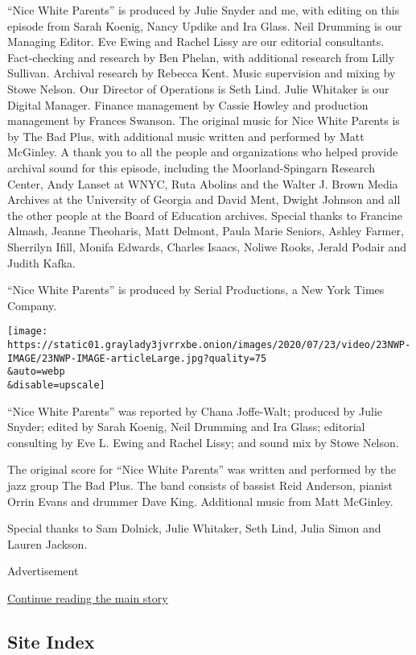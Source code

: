 ``Nice White Parents'' is produced by Julie Snyder and me, with editing
on this episode from Sarah Koenig, Nancy Updike and Ira Glass. Neil
Drumming is our Managing Editor. Eve Ewing and Rachel Lissy are our
editorial consultants. Fact-checking and research by Ben Phelan, with
additional research from Lilly Sullivan. Archival research by Rebecca
Kent. Music supervision and mixing by Stowe Nelson. Our Director of
Operations is Seth Lind. Julie Whitaker is our Digital Manager. Finance
management by Cassie Howley and production management by Frances
Swanson. The original music for Nice White Parents is by The Bad Plus,
with additional music written and performed by Matt McGinley. A thank
you to all the people and organizations who helped provide archival
sound for this episode, including the Moorland-Spingarn Research Center,
Andy Lanset at WNYC, Ruta Abolins and the Walter J. Brown Media Archives
at the University of Georgia and David Ment, Dwight Johnson and all the
other people at the Board of Education archives. Special thanks to
Francine Almash, Jeanne Theoharis, Matt Delmont, Paula Marie Seniors,
Ashley Farmer, Sherrilyn Ifill, Monifa Edwards, Charles Isaacs, Noliwe
Rooks, Jerald Podair and Judith Kafka.

``Nice White Parents'' is produced by Serial Productions, a New York
Times Company.

\texttt{[image: https://static01.graylady3jvrrxbe.onion/images/2020/07/23/video/23NWP-IMAGE/23NWP-IMAGE-articleLarge.jpg?quality=75\\\&auto=webp\\\&disable=upscale]}

``Nice White Parents'' was reported by Chana Joffe-Walt; produced by
Julie Snyder; edited by Sarah Koenig, Neil Drumming and Ira Glass;
editorial consulting by Eve L. Ewing and Rachel Lissy; and sound mix by
Stowe Nelson.

The original score for ``Nice White Parents'' was written and performed
by the jazz group The Bad Plus. The band consists of bassist Reid
Anderson, pianist Orrin Evans and drummer Dave King. Additional music
from Matt McGinley.

Special thanks to Sam Dolnick, Julie Whitaker, Seth Lind, Julia Simon
and Lauren Jackson.

Advertisement

\protect\hyperlink{after-bottom}{Continue reading the main story}

\hypertarget{site-index}{%
\subsection{Site Index}\label{site-index}}

